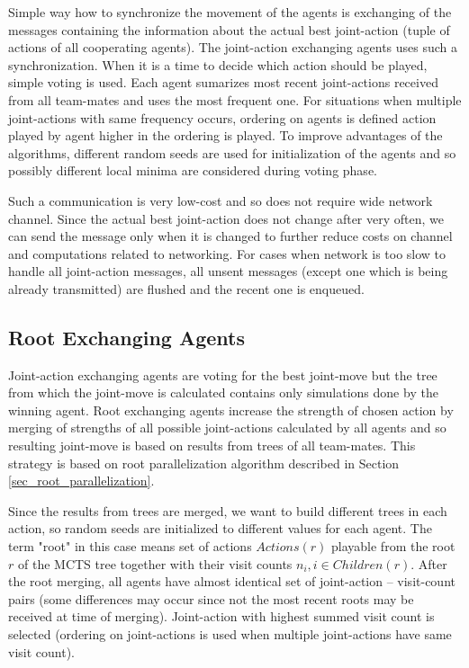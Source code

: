 Simple way how to synchronize the movement of the agents is exchanging of the messages
containing the information about the actual best joint-action (tuple of actions of all
cooperating agents). The joint-action exchanging agents uses such a synchronization. When it is
a time to decide which action should be played, simple voting is used. Each agent sumarizes
most recent joint-actions received from all team-mates and uses the most frequent one. For
situations when multiple joint-actions with same frequency occurs, ordering on agents is
defined action played by agent higher in the ordering is played. To improve advantages of the
algorithms, different random seeds are used for initialization of the agents and so possibly
different local minima are considered during voting phase.

Such a communication is very low-cost and so does not require wide network channel. Since the
actual best joint-action does not change after very often, we can send the message only when it
is changed to further reduce costs on channel and computations related to networking. For cases
when network is too slow to handle all joint-action messages, all unsent messages (except one
which is being already transmitted) are flushed and the recent one is enqueued.


\subsection{Root Exchanging Agents}
\label{sec_root_exchanging_agents}

Joint-action exchanging agents are voting for the best joint-move but the tree from which the
joint-move is calculated contains only simulations done by the winning agent. Root exchanging
agents increase the strength of chosen action by merging of strengths of all possible 
joint-actions calculated by
all agents and so resulting joint-move is based on results from trees of all team-mates. This
strategy is based on root parallelization algorithm described in Section
\ref{sec_root_parallelization}.

Since the results from trees are merged, we want to build different trees in each action, so 
random seeds
are initialized to different values for each agent. The term "root" in this case means set of
actions $Actions(r)$ playable from the root $r$ of the MCTS tree together with their visit
counts $n_i, i \in Children(r)$. After the root merging, all agents have almost identical
set of joint-action -- visit-count pairs (some differences may occur since not the most recent roots
may be received at time of merging). Joint-action with highest summed visit count is
selected (ordering on joint-actions is used when multiple joint-actions have same visit count).

